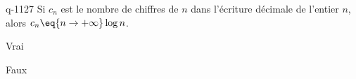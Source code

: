 \begin{truefalse}{q-1127}
Si $c_n$ est le nombre de chiffres de $n$ dans l'écriture décimale de l'entier $n$, alors $c_n \eq{n\to+\infty}  \log n$. 
\item Vrai
\item* Faux
\end{truefalse}

